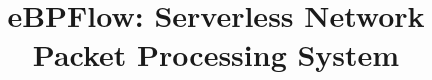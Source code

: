 \documentclass[pageno]{jpaper}
\begin{document}
\title{eBPFlow: Serverless Network Packet Processing System}

\date{}
\maketitle

\thispagestyle{empty}








%



\balance


\end{document}
